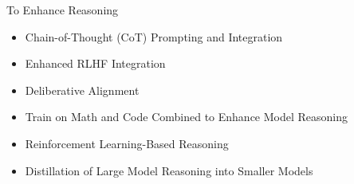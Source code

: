 \begin{frame}[fragile]{To Enhance Reasoning}


    \begin{itemize}
        \item  Chain-of-Thought (CoT) Prompting and Integration
        \item  Enhanced RLHF Integration
        \item  Deliberative Alignment
        \item  Train on Math and Code Combined to  Enhance Model Reasoning
        \item  Reinforcement Learning-Based Reasoning
        \item  Distillation of Large Model Reasoning into Smaller Models
    \end{itemize}
\end{frame}
